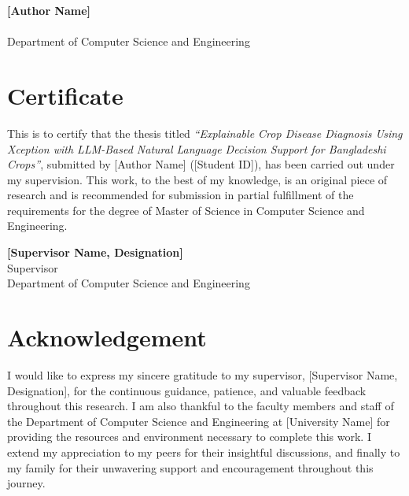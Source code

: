 \documentclass[12pt,a4paper,oneside]{report}
\newcommand{\thesistitle}{Explainable Crop Disease Diagnosis Using Xception with LLM-Based Natural Language Decision Support for Bangladeshi Crops}
\newcommand{\authorname}{[Author Name]}
\newcommand{\studentid}{[Student ID]}
\newcommand{\supervisorname}{[Supervisor Name, Designation]}
\newcommand{\departmentname}{Department of Computer Science and Engineering}
\newcommand{\universityname}{[University Name]}
\newcommand{\submissiondate}{[Month, Year]}
\begin{document}
\vspace{2cm}
\noindent\textbf{\authorname{}}\\
\studentid{}\\
\departmentname{}\\
\submissiondate{}

\chapter*{Certificate}
This is to certify that the thesis titled \textit{``\thesistitle''}, submitted by \authorname{}
(\studentid{}), has been carried out under my supervision. This work, to the best of my knowledge, is an
original piece of research and is recommended for submission in partial fulfillment of the requirements for the
degree of Master of Science in Computer Science and Engineering.

\vspace{2cm}
\noindent\textbf{\supervisorname{}}\\
Supervisor\\
\departmentname{}\\
\universityname{}

\chapter*{Acknowledgement}
I would like to express my sincere gratitude to my supervisor, \supervisorname{}, for the continuous guidance,
patience, and valuable feedback throughout this research. I am also thankful to the faculty members and staff of
the \departmentname{} at \universityname{} for providing the resources and environment necessary to complete this
work. I extend my appreciation to my peers for their insightful discussions, and finally to my family for their
unwavering support and encouragement throughout this journey.

\end{document}

